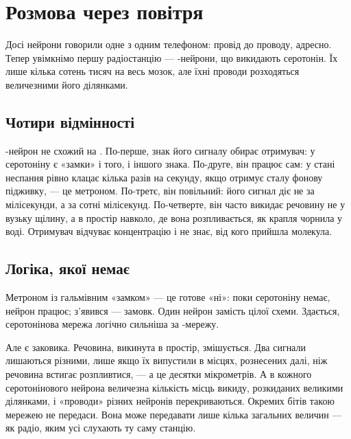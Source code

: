 \chapter{Розмова через повітря}


Досі нейрони говорили одне з одним телефоном: провід до проводу, адресно. Тепер увімкнімо першу радіостанцію --- -нейрони, що викидають серотонін. Їх лише кілька сотень тисяч на весь мозок, але їхні проводи розходяться величезними його ділянками.

\section*{Чотири відмінності}

-нейрон не схожий на . По-перше, знак його сигналу обирає отримувач: у серотоніну є «замки» і того, і іншого знака. По-друге, він працює сам: у стані неспання рівно клацає кілька разів на секунду, якщо отримує сталу фонову підживку, --- це метроном. По-третє, він повільний: його сигнал діє не за мілісекунди, а за сотні мілісекунд. По-четверте, він часто викидає речовину не у вузьку щілину, а в простір навколо, де вона розпливається, як крапля чорнила у воді. Отримувач відчуває концентрацію і не знає, від кого прийшла молекула.

\section*{Логіка, якої немає}

Метроном із гальмівним «замком» --- це готове «ні»: поки серотоніну немає, нейрон працює; з'явився --- замовк. Один нейрон замість цілої схеми. Здається, серотонінова мережа логічно сильніша за -мережу.

Але є заковика. Речовина, викинута в простір, змішується. Два сигнали лишаються різними, лише якщо їх випустили в місцях, рознесених далі, ніж речовина встигає розпливтися, --- а це десятки мікрометрів. А в кожного серотонінового нейрона величезна кількість місць викиду, розкиданих великими ділянками, і «проводи» різних нейронів перекриваються. Окремих бітів такою мережею не передаси. Вона може передавати лише кілька загальних величин --- як радіо, яким усі слухають ту саму станцію.

